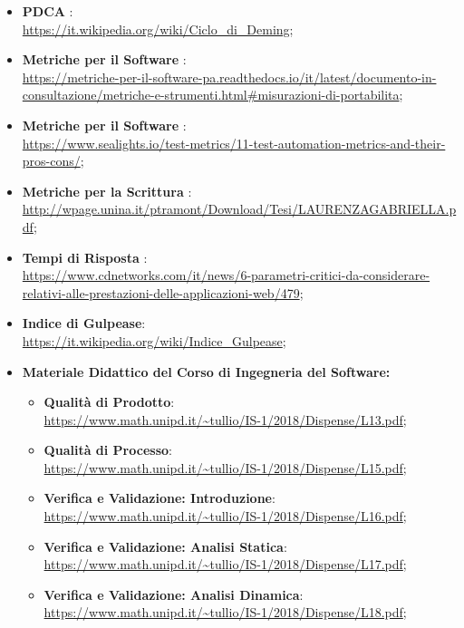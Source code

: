 	\begin{itemize}
		\item \textbf{PDCA} :\\ \url{https://it.wikipedia.org/wiki/Ciclo_di_Deming};
		\item \textbf{Metriche per il Software} :\\\url{https://metriche-per-il-software-pa.readthedocs.io/it/latest/documento-in-consultazione/metriche-e-strumenti.html#misurazioni-di-portabilita};
		\item \textbf{Metriche per il Software} :\\\url{https://www.sealights.io/test-metrics/11-test-automation-metrics-and-their-pros-cons/};
		\item \textbf{Metriche per la Scrittura} :\\\url{http://wpage.unina.it/ptramont/Download/Tesi/LAURENZAGABRIELLA.pdf};
		\item \textbf{Tempi di Risposta} :\\\url{https://www.cdnetworks.com/it/news/6-parametri-critici-da-considerare-relativi-alle-prestazioni-delle-applicazioni-web/479};
		\item \textbf{Indice di Gulpease}: \\ \url{https://it.wikipedia.org/wiki/Indice_Gulpease};
		
		
		\item \textbf{Materiale Didattico del Corso di Ingegneria del Software:}
			\begin{itemize}
				\item \textbf{Qualità di Prodotto}: \\ \url{https://www.math.unipd.it/~tullio/IS-1/2018/Dispense/L13.pdf};
				
				\item \textbf{Qualità di Processo}: \\ \url{https://www.math.unipd.it/~tullio/IS-1/2018/Dispense/L15.pdf};
				
				\item \textbf{Verifica e Validazione: Introduzione}: \\ \url{https://www.math.unipd.it/~tullio/IS-1/2018/Dispense/L16.pdf};
				
				\item \textbf{Verifica e Validazione: Analisi Statica}: \\ \url{https://www.math.unipd.it/~tullio/IS-1/2018/Dispense/L17.pdf};
				\item \textbf{Verifica e Validazione: Analisi Dinamica}: \\ \url{https://www.math.unipd.it/~tullio/IS-1/2018/Dispense/L18.pdf};
			\end{itemize}
			

\end{itemize}
